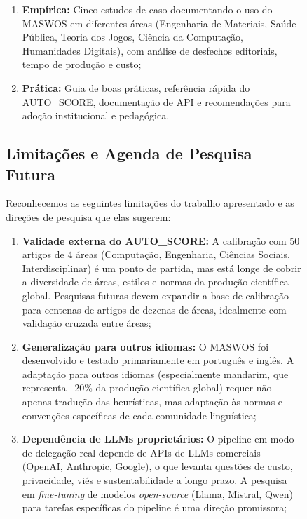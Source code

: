 \begin{figure}
\begin{enumerate}
    \item \textbf{Empírica:} Cinco estudos de caso documentando o
    uso do MASWOS em diferentes áreas (Engenharia de Materiais,
    Saúde Pública, Teoria dos Jogos, Ciência da Computação,
    Humanidades Digitais), com análise de desfechos editoriais,
    tempo de produção e custo;

    \item \textbf{Prática:} Guia de boas práticas, referência
    rápida do AUTO\_SCORE, documentação de API e recomendações
    para adoção institucional e pedagógica.
\end{enumerate}

\subsection{Limitações e Agenda de Pesquisa Futura}
\label{sec:agenda_final}

Reconhecemos as seguintes limitações do trabalho apresentado e
as direções de pesquisa que elas sugerem:

\begin{enumerate}
    \item \textbf{Validade externa do AUTO\_SCORE:} A calibração
    com 50 artigos de 4 áreas (Computação, Engenharia, Ciências
    Sociais, Interdisciplinar) é um ponto de partida, mas está
    longe de cobrir a diversidade de áreas, estilos e normas da
    produção científica global. Pesquisas futuras devem expandir
    a base de calibração para centenas de artigos de dezenas de
    áreas, idealmente com validação cruzada entre áreas;

    \item \textbf{Generalização para outros idiomas:} O MASWOS
    foi desenvolvido e testado primariamente em português e
    inglês. A adaptação para outros idiomas (especialmente
    mandarim, que representa ~20\% da produção científica
    global) requer não apenas tradução das heurísticas, mas
    adaptação às normas e convenções específicas de cada
    comunidade linguística;

    \item \textbf{Dependência de LLMs proprietários:} O pipeline
    em modo de delegação real depende de APIs de LLMs
    comerciais (OpenAI, Anthropic, Google), o que levanta
    questões de custo, privacidade, viés e sustentabilidade a
    longo prazo. A pesquisa em \textit{fine-tuning} de modelos
    \textit{open-source} (Llama, Mistral, Qwen) para tarefas
    específicas do pipeline é uma direção promissora;


\end{enumerate}
\end{figure}
